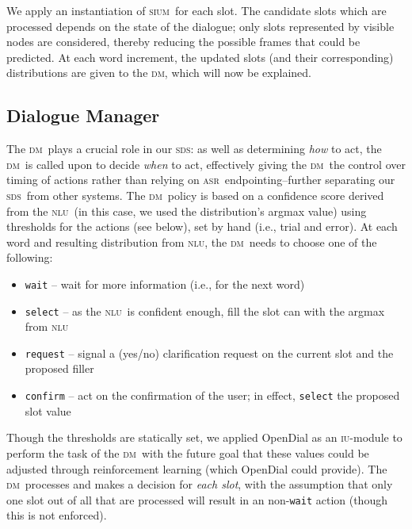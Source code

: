 \documentclass[11pt]{article}
\newcommand{\sds}[0]{\textsc{sds}}
\newcommand{\nlu}[0]{\textsc{nlu}}
\newcommand{\sium}[0]{\textsc{sium}}
\newcommand{\asr}[0]{\textsc{asr}}
\newcommand{\dm}[0]{\textsc{dm}}
\newcommand{\iu}[0]{\textsc{iu}}
\begin{document}
We apply an instantiation of \sium\ for each slot. The candidate slots which are processed depends on the state of the dialogue; only slots represented by visible nodes are considered, thereby reducing the possible frames that could be predicted. At each word increment, the updated slots (and their corresponding) distributions are given to the \dm, which will now be explained. 

\subsection{Dialogue Manager}

The \dm\ plays a crucial role in our \sds: as well as determining \emph{how} to act, the \dm\ is called upon to decide \emph{when} to act, effectively giving the \dm\ the control over timing of actions rather than relying on \asr\ endpointing--further separating our \sds\ from other systems. The \dm\ policy is based on a confidence score derived from the \nlu\ (in this case, we used the distribution's argmax value) using thresholds for the actions (see below), set by hand (i.e., trial and error). At each word and resulting distribution from \nlu, the \dm\ needs to choose one of the following:

\begin{itemize}
 \item \texttt{wait} -- wait for more information (i.e., for the next word) %
 \item \texttt{select} -- as the \nlu\ is confident enough, fill the slot can with the argmax from \nlu %
 \item \texttt{request} -- signal a (yes/no) clarification request on the current slot and the proposed filler%
 \item \texttt{confirm} -- act on the confirmation of the user; in effect, \texttt{select} the proposed slot value%
\end{itemize}

Though the thresholds are statically set, we applied OpenDial \cite{Lison2015a} as an \iu-module to perform the task of the \dm\ with the future goal that these values could be adjusted through reinforcement learning (which OpenDial could provide). The \dm\ processes and makes a decision for \emph{each slot}, with the assumption that only one slot out of all that are processed will result in an non-\texttt{wait} action (though this is not enforced). 
\end{document}
